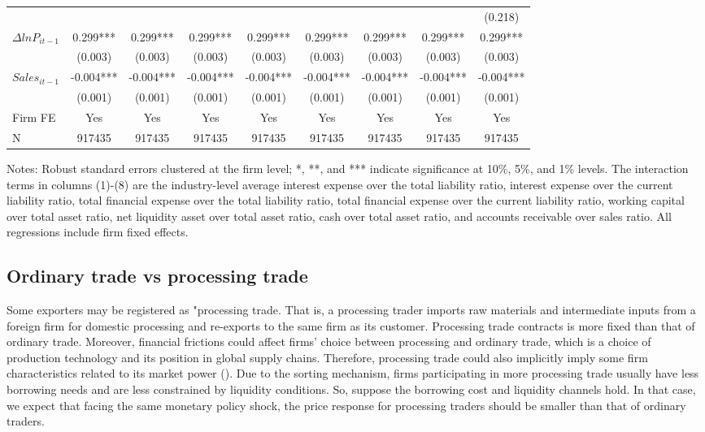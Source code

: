 \begin{table}[htbp]
{\begin{threeparttable}
\begin{tabular}{lcccccccc}
          &       &       &       &       &       &       &       & (0.218) \\
    $\Delta ln P_{it-1}$ & 0.299*** & 0.299*** & 0.299*** & 0.299*** & 0.299*** & 0.299*** & 0.299*** & 0.299*** \\
          & (0.003) & (0.003) & (0.003) & (0.003) & (0.003) & (0.003) & (0.003) & (0.003) \\
    $Sales_{it-1}$ & -0.004*** & -0.004*** & -0.004*** & -0.004*** & -0.004*** & -0.004*** & -0.004*** & -0.004*** \\
          & (0.001) & (0.001) & (0.001) & (0.001) & (0.001) & (0.001) & (0.001) & (0.001) \\
    \midrule
    Firm FE & Yes   & Yes   & Yes   & Yes   & Yes   & Yes   & Yes   & Yes \\
    N     & 917435 & 917435 & 917435 & 917435 & 917435 & 917435 & 917435 & 917435 \\
        \bottomrule
    \end{tabular}
        \begin{tablenotes}
            \footnotesize
            \item Notes: Robust standard errors clustered at the firm level;  *, **, and *** indicate significance at 10\%, 5\%, and 1\% levels. The interaction terms in columns (1)-(8) are the industry-level average interest expense over the total liability ratio, interest expense over the current liability ratio, total financial expense over the total liability ratio, total financial expense over the current liability ratio, working capital over total asset ratio, net liquidity asset over total asset ratio, cash over total asset ratio, and accounts receivable over sales ratio. All regressions include firm fixed effects.
	\end{tablenotes}
    \end{threeparttable}
    }
    \label{tab.non-linearity}
\end{table}

\subsection{Ordinary trade vs processing trade}

Some exporters may be registered as "processing trade. That is, a processing trader imports raw materials and intermediate inputs from a foreign firm for domestic processing and re-exports to the same firm as its customer. Processing trade contracts is more fixed than that of ordinary trade. Moreover, financial frictions could affect firms' choice between processing and ordinary trade, which is a choice of production technology and its position in global supply chains. Therefore, processing trade could also implicitly imply some firm characteristics related to its market power (\cite{manova2016firms}). Due to the sorting mechanism, firms participating in more processing trade usually have less borrowing needs and are less constrained by liquidity conditions. So, suppose the borrowing cost and liquidity channels hold. In that case, we expect that facing the same monetary policy shock, the price response for processing traders should be smaller than that of ordinary traders.

